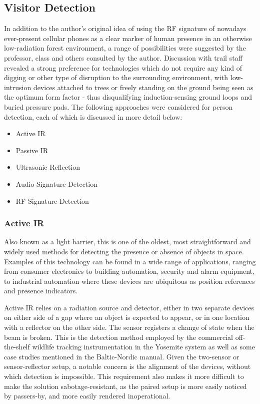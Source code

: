 \documentclass[10pt,nocopyrightspace]{ewsn-proc}
\begin{document}
\subsection{Visitor Detection}

In addition to the author’s original idea of using the RF signature of nowadays ever-present cellular phones as a clear marker of human presence in an otherwise low-radiation forest environment, a range of possibilities were suggested by the professor, class and others consulted by the author. Discussion with trail staff revealed a strong preference for technologies which do not require any kind of digging or other type of disruption to the surrounding environment, with low-intrusion devices attached to trees or freely standing on the ground being seen as the optimum form factor - thus disqualifying induction-sensing ground loops and buried pressure pads. The following approaches were considered for person detection, each of which is discussed in more detail below:
\begin{itemize}
\item Active IR
\item Passive IR
\item Ultrasonic Reflection
\item Audio Signature Detection
\item RF Signature Detection
\end{itemize}


\subsubsection{Active IR}
Also known as a light barrier, this is one of the oldest, most straightforward and widely used methods for detecting the presence or absence of objects in space. Examples of this technology can be found in a wide range of applications, ranging from consumer electronics to building automation, security and alarm equipment, to industrial automation where these devices are ubiquitous as position references and presence indicators.

Active IR relies on a radiation source and detector, either in two separate devices on either side of a gap where an object is expected to appear, or in one location with a reflector on the other side. The sensor registers a change of state when the beam is broken. This is the detection method employed by the commercial off-the-shelf wildlife tracking instrumentation in the Yosemite system\cite{Pettebone:Yosemite} as well as some case studies mentioned in the Baltic-Nordic manual\cite{Kajala:Baltic}. Given the two-sensor or sensor-reflector setup, a notable concern is the alignment of the devices, without which detection is impossible. This requirement also makes it more difficult to make the solution sabotage-resistant, as the paired setup is more easily noticed by passers-by, and more easily rendered inoperational.
\end{document}
